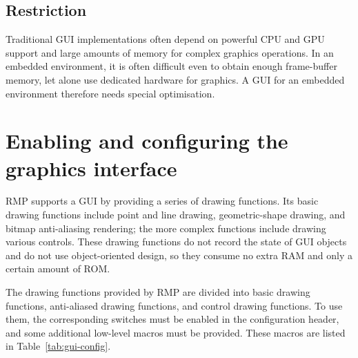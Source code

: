 \subsection{Restriction}

Traditional GUI implementations often depend on powerful CPU and GPU support and large amounts of memory for complex graphics operations.
In an embedded environment, it is often difficult even to obtain enough frame-buffer memory, let alone use dedicated hardware for graphics.
A GUI for an embedded environment therefore needs special optimisation.

\section{Enabling and configuring the graphics interface}

RMP supports a GUI by providing a series of drawing functions.
Its basic drawing functions include point and line drawing, geometric-shape drawing, and bitmap anti-aliasing rendering; the more complex functions include drawing various controls.
These drawing functions do not record the state of GUI objects and do not use object-oriented design, so they consume no extra RAM and only a certain amount of ROM.

The drawing functions provided by RMP are divided into basic drawing functions, anti-aliased drawing functions, and control drawing functions.
To use them, the corresponding switches must be enabled in the configuration header, and some additional low-level macros must be provided.
These macros are listed in Table~\ref{tab:gui-config}.

